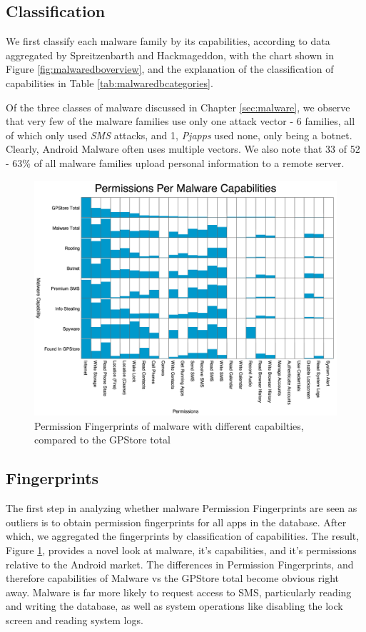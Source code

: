 \subsection{Classification}
We first classify each malware family by its capabilities, according to data aggregated by Spreitzenbarth\citep{spreitzenbarth2013} and Hackmageddon\citep{hackmageddon2011}, with the chart shown in Figure \ref{fig:malwaredboverview}, and the explanation of the classification of capabilities in Table \ref{tab:malwaredbcategories}.

Of the three classes of malware discussed in Chapter \ref{sec:malware}, we observe that very few of the malware families use only one attack vector - 6 families, all of which only used \textit{SMS} attacks, and 1, \textit{Pjapps} used none, only being a botnet. Clearly, Android Malware often uses multiple vectors. We also note that 33 of 52 - 63\% of all malware families upload personal information to a remote server. 

\begin{figure}[h]
\begin{center}
\includegraphics[width=1.0\columnwidth]{figs/MalwareCapabiltiesPermissions}
\caption{Permission Fingerprints of malware with different capabilties, compared to the GPStore total}
\label{fig:malwarefingerprint}
\end{center}
\end{figure}

\subsection{Fingerprints}
The first step in analyzing whether malware Permission Fingerprints are seen as outliers is to obtain permission fingerprints for all apps in the database. After which, we aggregated the fingerprints by classification of capabilities. The result, Figure \ref{fig:malwarefingerprint}, provides a novel look at malware, it's capabilities, and it's permissions relative to the Android market. The differences in Permission Fingerprints, and therefore capabilities of Malware vs the GPStore total become obvious right away. Malware is far more likely to request access to SMS, particularly reading and writing the database, as well as system operations like disabling the lock screen and reading system logs. 

